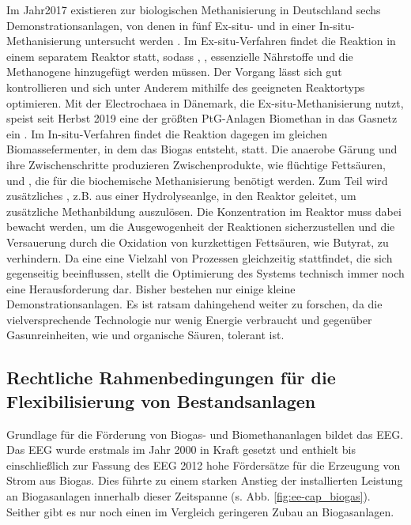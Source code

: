 Im Jahr\SI{2017}{\relax} existieren zur biologischen Methanisierung in Deutschland sechs Demonstrationsanlagen, von denen in fünf Ex-situ- und in einer In-situ-Methanisierung untersucht werden \parencite{4.2b17}. Im Ex-situ-Verfahren findet die Reaktion in einem separatem Reaktor statt, sodass , , essenzielle Nährstoffe und die Methanogene hinzugefügt werden müssen. Der Vorgang lässt sich gut kontrollieren und sich unter Anderem mithilfe des geeigneten Reaktortyps optimieren. Mit der Electrochaea in Dänemark, die Ex-situ-Methanisierung nutzt, speist seit Herbst 2019 eine der größten PtG-Anlagen Biomethan in das Gasnetz ein \parencite{Echae19}.\parencite{KGKK2019} \parencite{AONC2019} \parencite{VRM2019} \newline 
Im In-situ-Verfahren findet die Reaktion dagegen im gleichen Biomassefermenter, in dem das Biogas entsteht, statt. Die anaerobe Gärung und ihre Zwischenschritte produzieren Zwischenprodukte, wie flüchtige Fettsäuren,  und , die für die biochemische Methanisierung benötigt werden. Zum Teil wird zusätzliches , z.B. aus einer Hydrolyseanlge, in den  Reaktor geleitet, um zusätzliche Methanbildung auszulösen. Die  Konzentration im Reaktor muss dabei bewacht werden, um die Ausgewogenheit der Reaktionen sicherzustellen und die Versauerung durch die Oxidation von kurzkettigen Fettsäuren, wie Butyrat, zu verhindern. Da eine eine Vielzahl von Prozessen gleichzeitig stattfindet, die sich gegenseitig beeinflussen, stellt die Optimierung des Systems technisch immer noch eine Herausforderung dar. Bisher bestehen nur einige kleine Demonstrationsanlagen. Es ist ratsam dahingehend weiter zu forschen, da die vielversprechende Technologie nur wenig Energie verbraucht und gegenüber Gasunreinheiten, wie  und organische Säuren, tolerant ist. 
\parencite{VRM2019} \parencite{KGKK2019} \parencite{AONC2019} \smallskip






\subsection{Rechtliche Rahmenbedingungen für die Flexibilisierung von Bestandsanlagen}\label{chap:law_theo}

Grundlage für die Förderung von Biogas- und Biomethananlagen bildet das \gls{EEG}. Das \gls{EEG} wurde erstmals im Jahr 2000 in Kraft gesetzt und enthielt bis einschließlich zur Fassung des \gls{EEG} \SI{2012}{\relax} hohe Fördersätze für die Erzeugung von Strom aus Biogas. Dies führte zu einem starken Anstieg der installierten Leistung an Biogasanlagen innerhalb dieser Zeitspanne (s. Abb. \ref{fig:ee-cap_biogas}). Seither gibt es nur noch einen im Vergleich geringeren Zubau an Biogasanlagen. \parencite{DanielGromke2019}\smallskip


